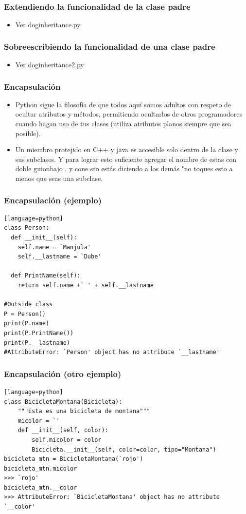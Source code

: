 \documentclass[hyperref={pdfpagelabels=false},xcolor=pst,pdf,fragile]{beamer}
\begin{document}
\begin{frame}
    \frametitle{Extendiendo la funcionalidad de la clase padre}
    \pause
    \begin{itemize}
    \item Ver dog\textunderscore inheritance.py
    \end{itemize}
\end{frame}

\begin{frame}
    \frametitle{Sobreescribiendo la funcionalidad de una clase padre}
    \pause
    \begin{itemize}
    \item Ver dog\textunderscore inheritance2.py
    \end{itemize}
\end{frame}

\begin{frame}
    \frametitle{Encapsulación}
    \pause
    \begin{itemize}
    \item Python sigue la filosofía de que todos aquí somos adultos con respeto de ocultar atributos y métodos, permitiendo ocultarlos de otros programadores cuando hagan uso de tus clases (utiliza atributos planos siempre que sea posible).
    \item Un miembro protejido en C++ y java es accesible solo dentro de la clase y sus subclases. Y para lograr esto suficiente agregar el nombre de estas con doble guionbajo \textunderscore \textunderscore , y cone sto estás diciendo a los demás "no toques esto a menos que seas una subclase.
    \end{itemize}
\end{frame}

\begin{frame}[fragile]
    \frametitle{Encapsulación (ejemplo)}
    \begin{lstlisting}[basicstyle=\tiny][language=python]
class Person:
  def __init__(self): 
    self.name = `Manjula'
    self.__lastname = `Dube'
    
  def PrintName(self):
    return self.name +` ' + self.__lastname
    
#Outside class    
P = Person()
print(P.name)
print(P.PrintName())
print(P.__lastname)
#AttributeError: `Person' object has no attribute `__lastname'
    \end{lstlisting}
\end{frame}

\begin{frame}[fragile]
    \frametitle{Encapsulación (otro ejemplo)}
    \begin{lstlisting}[basicstyle=\tiny][language=python]
class BicicletaMontana(Bicicleta):
    """Esta es una bicicleta de montana"""
    micolor = `'
    def __init__(self, color):
        self.micolor = color
        Bicicleta.__init__(self, color=color, tipo="Montana")
bicicleta_mtn = BicicletaMontana(`rojo')
bicicleta_mtn.micolor
>>> `rojo'
bicicleta_mtn.__color
>>> AttributeError: `BicicletaMontana' object has no attribute `__color'
    \end{lstlisting}
\end{frame}
\end{document}
